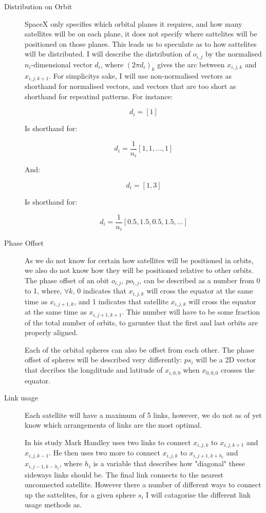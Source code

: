 \documentclass[12pt]{article}
\begin{document}
\begin{description}
\item[Distribution on Orbit]
SpaceX only specifies which orbital planes it requires, and how many satellites will be on each plane, it does not specify where sattelites will be positioned on those planes. This leads us to speculate as to how sattelites will be distributed. I will describe the distribution of $o_{i,j}$ by the normalised $n_i$-dimensional vector $d_i$, where $(2\pi d_i)_k$ gives the arc between $x_{i,j,k}$ and $x_{i,j,k+1}$. For simplicitys sake, I will use non-normalised vectors as shorthand for normalised vectors, and vectors that are too short as shorthand for repeatind patterns. For instance:

\[d_i = [1]\] 

Is shorthand for:

\[d_i = \frac{1}{n_i}[1,1,...,1]\] 

And:

\[d_i = [1,3]\] 

Is shorthand for:

\[d_i = \frac{1}{n_i}[0.5,1.5,0.5,1.5,...]\]

	
\item[Phase Offset]
As we do not know for certain how satellites will be positioned in orbits, we also do not know how they will be positioned relative to other orbits. The phase offset of an obit $o_{i,j}$, $po_{i,j}$, can be described as a number from 0 to 1, where, $\forall k$, 0 indicates that  $x_{i,j,k}$ will cross the equator at the same time as $x_{i,j+1,k}$, and 1 indicates that satellite $x_{i,j,k}$ will cross the equator at the same time as $x_{i,j+1,k+1}$. This number will have to be some fraction of the total number of orbits, to garuntee that the first and last orbits are properly aligned.

Each of the orbital spheres can also be offset from each other. The phase offset of spheres will be described very differently: $ps_i$ will be a 2D vector that decribes the longditude and latitude of $x_{i,0,0}$ when $x_{0,0,0}$ crosses the equator.

\item[Link usage]
Each satellite will have a maximum of 5 links, however, we do not as of yet know which arrangements of links are the most optimal.

In his study Mark Handley uses two links to connect $x_{i,j,k}$ to $x_{i,j,k+1}$ and $x_{i,j,k-1}$. He then uses two more to connect $x_{i,j,k}$ to $x_{i,j+1,k+h_i}$ and $x_{i,j-1,k-h_i}$, where $h_i$ is a variable that describes how "diagonal" these sideways links should be. The final link connects to the nearest unconnected satellite. However there a number of different ways to connect up the sattelites, for a given sphere $s_i$ I will catagorise the different link usage methods as.


\end{description}
\end{document}
